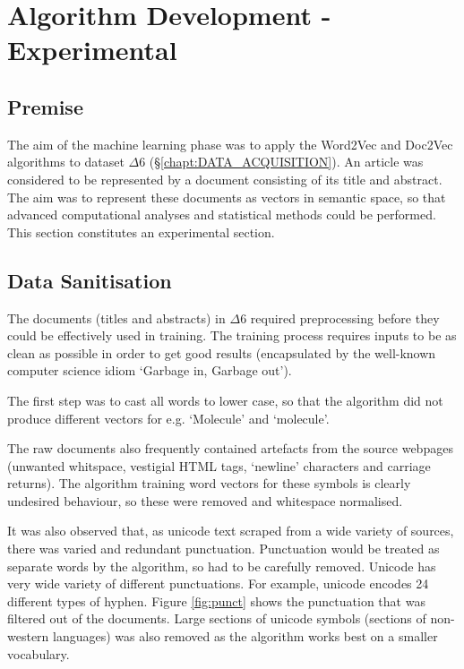 \chapter{Algorithm Development - Experimental}
\addtocounter{page}{1}
\label{chapt:ALGORITHM}
\section{Premise}
The aim of the machine learning phase was to apply the Word2Vec and Doc2Vec algorithms to dataset $\Delta6$ (\S\ref{chapt:DATA_ACQUISITION}). An article was considered to be represented by a document consisting of its title and abstract. The aim was to represent these documents as vectors in semantic space, so that advanced computational analyses and statistical methods could be performed. This section constitutes an experimental section.
\section{Data Sanitisation} 
The documents (titles and abstracts) in $\Delta6$ required preprocessing before they could be effectively used in training. The training process requires inputs to be as clean as possible in order to get good results (encapsulated by the well-known computer science idiom `Garbage in, Garbage out'). 

The first step was to cast all words to lower case, so that the algorithm did not produce different vectors for e.g.  `Molecule' and `molecule'.

The raw documents also frequently contained artefacts from the source webpages (unwanted whitspace, vestigial HTML tags, `newline' characters and carriage returns). The algorithm training word vectors for these symbols is clearly undesired behaviour, so these were removed and whitespace normalised.

It was also observed that, as unicode text scraped from a wide variety of sources, there was varied and redundant punctuation. Punctuation would be treated as separate words by the algorithm, so had to be carefully removed. Unicode has very wide variety of different punctuations. For example, unicode encodes 24 different types of hyphen. Figure \ref{fig:punct} shows the punctuation that was filtered out of the documents. Large sections of unicode symbols (sections of non-western languages) was also removed as the algorithm works best on a smaller vocabulary.


